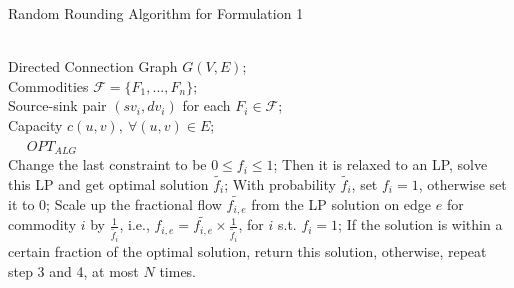 \documentclass[conference]{IEEEtran}
\begin{document}
\begin{algorithm}[t]
	\small
	\renewcommand{\algorithmicrequire}{\textbf{Input:}}
	\renewcommand\algorithmicensure {\textbf{Output:} }
	\caption{Random Rounding Algorithm for Formulation 1}
	\label{alg:randomrounding}
	\begin{algorithmic}[1] %
		\REQUIRE ~~\\ %
		Directed Connection Graph $G(V, E)$;\\
		Commodities $\mathcal{F} = \{F_1, ..., F_n\}$;\\
		Source-sink pair $(sv_i, dv_i)$ for each $ F_i \in \mathcal{F}$;\\
		Capacity $c(u, v), ~ \forall (u, v)\in E$;\\
		\ENSURE ~~ $OPT_{ALG}$\\ 
		\STATE Change the last constraint to be 
		$0 \leq f_i \leq 1$;
		\STATE Then it is relaxed to an LP, solve this LP and get optimal solution $\tilde{f_i}$;
		\STATE With probability $\tilde{f_i}$, set $f_i = 1$, otherwise set it to $0$;
		\STATE Scale up the fractional flow $\tilde{f_{i,e}}$ from the LP solution on edge $e$ for commodity $i$ by $\frac{1}{\tilde{f_i}}$, i.e., $f_{i,e} = \tilde{f_{i,e}} \times \frac{1}{\tilde{f_i}}$, for $i$ s.t. $f_i = 1$;
		\STATE If the solution is within a certain fraction of the optimal solution, return this solution, otherwise, repeat step 3 and 4, at most $N$ times.
		
	\end{algorithmic}
\end{algorithm}
\end{document}
